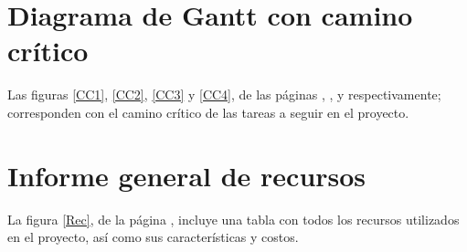 \documentclass[11pt,a4paper,spanish,twoside]{book}
\begin{document}
\begin{sidewaystable}
\end{sidewaystable}

\begin{sidewaystable}
\end{sidewaystable}

\begin{sidewaystable}
\end{sidewaystable}

\section{Diagrama de Gantt con camino crítico}
Las figuras \ref{CC1}, \ref{CC2}, \ref{CC3} y \ref{CC4}, de las páginas
\pageref{CC1}, \pageref{CC2}, \pageref{CC3} y \pageref{CC4} respectivamente;
corresponden con el camino crítico de las tareas a seguir en el proyecto.

\begin{sidewaystable}
\end{sidewaystable}

\begin{sidewaystable}
\end{sidewaystable}

\begin{sidewaystable}
\end{sidewaystable}

\begin{sidewaystable}
\end{sidewaystable}

\section{Informe general de recursos}
La figura \ref{Rec}, de la página \pageref{Rec}, incluye una tabla con todos
los recursos utilizados en el proyecto, así como sus características y costos.
\begin{sidewaystable}
\end{sidewaystable}
\end{document}
